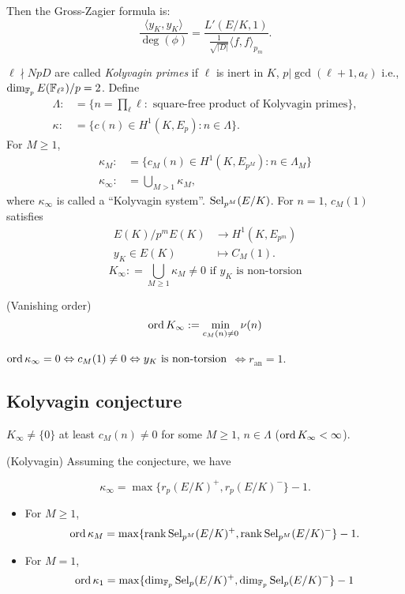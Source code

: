 \documentclass[12pt,amsfont]{amsart}
\begin{document}
Then the Gross-Zagier formula is: 
\[
\displaystyle \frac{\langle y_K, y_K \rangle}{\deg(\phi)} = \frac{L'(E/K, 1)}{\frac{1}{\sqrt{|D|}} \langle f, f \rangle_{p_m}}.
\]
\begin{dfn} $\ell \nmid NpD$ are called \emph{Kolyvagin primes} if $\ell$ is inert in $K$, $p | \gcd(\ell+1, a_\ell)$ i.e.,  $\dim_{{\mathbb F}_p} E({\mathbb F}_{\ell^2})/p = 2$. Define
\begin{align*}
\Lambda :&= \{ n = \prod_{\ell} \ell : \text{ square-free product of Kolyvagin primes} \},\\
\kappa :&= \{c(n) \in H^1(K, E_p): n \in \Lambda\}.
\end{align*}
For $M \geq 1$, 
\begin{align*}
\kappa_M :&= \{c_M(n) \in H^1(K, E_{p^M}): n \in \Lambda_M\}\\
\kappa_\infty:& = \bigcup_{M > 1} \kappa_M,
\end{align*}
where $\kappa_\infty$ is called a ``Kolyvagin system''.
$\operatorname{Sel}_{p^M}(E/K)$. For $n = 1$, $c_M(1)$ satisfies
\begin{align*}
E(K)/p^m E(K) &\rightarrow H^1(K, E_{p^m})\\
y_K \in E(K) &\mapsto C_M(1).
\end{align*}
\[
K_\infty: = \bigcup_{M \geq 1} \kappa_M \ne 0 \text{ if } y_K \text{ is non-torsion}\]
\end{dfn}

\begin{dfn} (Vanishing order) 
\[
\operatorname{ord} K_\infty: = \min_{c_M(n) \ne 0} \nu(n)
\]
\end{dfn}

\begin{xmp} $\operatorname{ord} \kappa_\infty = 0 \Leftrightarrow c_M(1) \ne 0 \Leftrightarrow y_K \text{ is non-torsion}$ $\Leftrightarrow r_{\text{an}} = 1$. 
\end{xmp}

\subsection{Kolyvagin conjecture}

\begin{cnj} $K_\infty \ne \{0\}$ at least $c_M(n) \ne 0$ for some $M \geq 1$, $n \in \Lambda$ ($\operatorname{ord} K_\infty < \infty$). 
\end{cnj}

\begin{thm} (Kolyvagin) Assuming the conjecture, we have

\[\kappa_\infty = \max \{ r_p(E/K)^+, r_p(E/K)^{-}\} - 1.\]
\begin{itemize}
\item For $M \geq 1$, 
\[
\operatorname{ord} \kappa_M = \max \{\operatorname{rank} \operatorname{Sel}_{p^M}(E/K)^+, \operatorname{rank} \operatorname{Sel}_{p^M}(E/K)^{-}\} - 1.
\] 
\item
For $M = 1$,
\[
\operatorname{ord} \kappa_1 = \max \{\dim_{{\mathbb F}_p} \operatorname{Sel}_p(E/K)^+, \dim_{{\mathbb F}_p} \operatorname{Sel}_p(E/K)^{-}\} - 1
\]
\end{itemize}
\end{thm}
\end{document}
